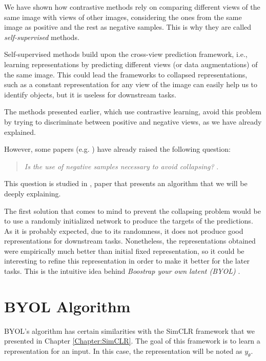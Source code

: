 \label{Chapter:BYOL}


We have shown how contrastive methods rely on comparing different views of the same image with views of other images, considering the ones from the same image as positive and the rest as negative samples. This is why they are called \emph{self-supervised} methods.

Self-supervised methods build upon the cross-view prediction framework, i.e., learning representations by predicting different views (or data augmentations) of the same image. This could lead the frameworks to collapsed representations, such as a constant representation for any view of the image can easily help us to identify objects, but it is useless for downstream tasks.

The methods presented earlier, which use contrastive learning, avoid this problem by trying to discriminate between positive and negative views, as we have already explained.

However, some papers (e.g. \cite{caron2019deep}) have already raised the following question:

\begin{quote}
    \centering
\emph{ Is the use of negative samples necessary to avoid collapsing? }. 
\end{quote}
This question is studied in \cite{grill2020bootstrap}, paper that presents an algorithm that we will be deeply explaining.

The first solution that comes to mind to prevent the collapsing problem would be to use a randomly initialized network to produce the targets of the predictions. As it is probably expected, due to its randomness, it does not produce good representations for downstream tasks. Nonetheless, the representations obtained were empirically much better than initial fixed representation, so it could be interesting to refine this representation in order to make it better for the later tasks. This is the intuitive idea behind \emph{Boostrap your own latent (BYOL)} \citep{grill2020bootstrap}.

\section{BYOL Algorithm}

BYOL's algorithm has certain similarities with the SimCLR framework that we presented in Chapter \ref{Chapter:SimCLR}. The goal of this framework is to learn a representation for an input. In this case, the representation will be noted as $y_\theta$. 

